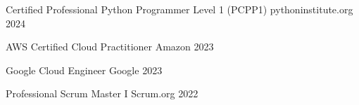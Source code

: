 

\begin{cvhonors}

  \cvhonor
    {Certified Professional Python Programmer Level 1 (PCPP1)} %
    {pythoninstitute.org} %
    {} %
    {2024} %
    
  \cvhonor
    {AWS Certified Cloud Practitioner} %
    {Amazon} %
    {} %
    {2023} %
    
  \cvhonor
    {Google Cloud Engineer} %
    {Google} %
    {} %
    {2023} %
    

  \cvhonor
    {Professional Scrum Master I} %
    {Scrum.org} %
    {} %
    {2022} %


\end{cvhonors}
